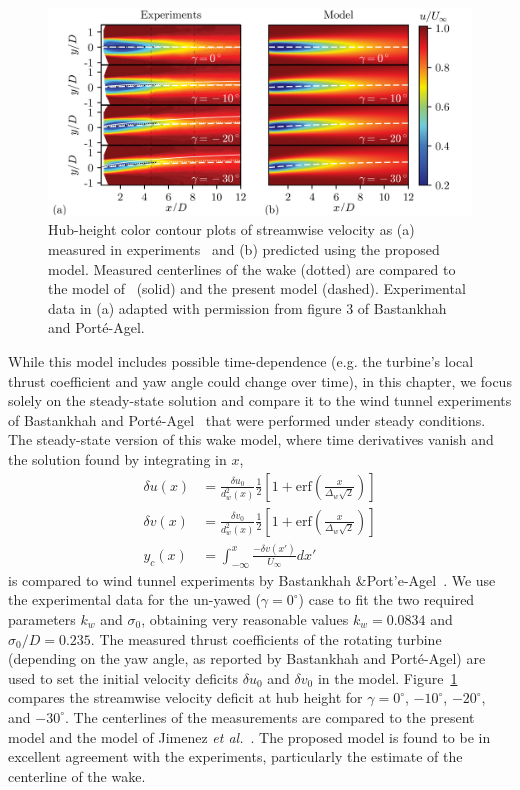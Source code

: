 \begin{figure}[h!]
\begin{center}
\includegraphics[width=\textwidth]{./fig/bastankhah_comparison_overlay.png}
\caption{\label{fig:far_wake} Hub-height color contour plots of streamwise velocity as (a) measured in experiments~\cite{Bastankhah2016a} and (b) predicted using the proposed model. 
Measured centerlines of the wake (dotted) are compared to the model of~\cite{Jimenez2010a} (solid) and the present model (dashed).  Experimental data in (a) adapted with permission from figure 3 of Bastankhah and Port\'{e}-Agel\cite{Bastankhah2016a}.}
\end{center}
\end{figure}

While this model includes possible time-dependence (e.g. the turbine's local thrust coefficient and yaw angle could change over time), in this chapter, we focus solely on the steady-state solution and compare it to the wind tunnel experiments of Bastankhah and Port\'{e}-Agel~\cite{Bastankhah2016a} that were performed under steady conditions. The steady-state version of this wake model, where time derivatives vanish and the solution found by integrating in $x$,
\begin{align}
\delta u(x) &= \frac{\delta u_0}{d_w^2(x)} \frac{1}{2}\left[1 + \mathrm{erf}\left(\frac{x}{\Delta_w \sqrt{2}}\right)\right]\\
\delta v(x) &= \frac{\delta v_0}{d_w^2(x)} \frac{1}{2}\left[1 + \mathrm{erf}\left(\frac{x}{\Delta_w \sqrt{2}}\right)\right]\\
y_c(x) &= \int_{-\infty}^x \frac{-\delta v(x')}{U_\infty} dx'
\end{align}
is compared to wind tunnel experiments by Bastankhah \&Port'{e}-Agel~\cite{Bastankhah2016a}. We use the experimental data for the un-yawed \mbox{($\gamma = 0^\circ$)} case to fit the two required  parameters $k_w$ and $\sigma_0$, obtaining very reasonable values $k_w=0.0834$ and  $\sigma_0 /D = 0.235$. 
The measured thrust coefficients of the rotating turbine (depending on the yaw angle, as reported by Bastankhah and Port\'{e}-Agel\cite{Bastankhah2016a}) are used to set the initial velocity deficits $\delta u_0$ and $\delta v_0$ in the model. Figure~\ref{fig:far_wake} compares the streamwise velocity deficit at hub height for $\gamma = 0^\circ$, $-10^\circ$, $-20^\circ$, and $-30^\circ$. The centerlines of the measurements are compared to the present model and the model of Jimenez \textit{et al.}~\cite{Jimenez2010a}. The proposed model is found to be in excellent agreement with the experiments, particularly the estimate of the centerline of the wake.  

